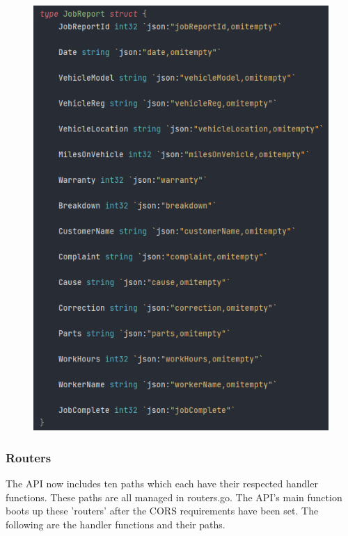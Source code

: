 \begin{figure}[H]
\begin{minipage}[b]{0.45\linewidth}
    \includegraphics[width=1.0\textwidth]{images/horton/models/report_struct.png}
\end{minipage}
\end{figure}

\subsubsection{Routers}
The API now includes ten paths which each have their respected handler functions.
These paths are all managed in routers.go. The API's main function boots up these 'routers' after the CORS requirements have been set. The following are the handler functions and their paths.  

